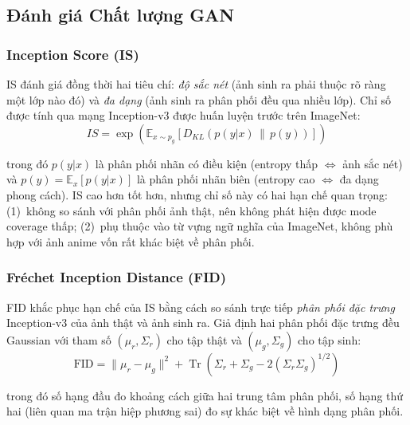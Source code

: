 \subsection{Đánh giá Chất lượng GAN}
\label{subsec:gan_metrics}

\subsubsection{Inception Score (IS)}
\label{subsubsec:is}

IS \cite{Salimans2016} đánh giá đồng thời hai tiêu chí: \textit{độ sắc nét} (ảnh sinh ra phải thuộc rõ ràng một lớp nào đó) và \textit{đa dạng} (ảnh sinh ra phân phối đều qua nhiều lớp). Chỉ số được tính qua mạng Inception-v3 \cite{Szegedy2016} được huấn luyện trước trên ImageNet:
\begin{equation}
\label{eq:inception_score}
IS = \exp\!\left(\mathbb{E}_{x \sim p_g}\left[D_{KL}\!\left(p(y|x) \,\|\, p(y)\right)\right]\right)
\end{equation}

\noindent trong đó $p(y|x)$ là phân phối nhãn có điều kiện (entropy thấp $\Leftrightarrow$ ảnh sắc nét) và $p(y) = \mathbb{E}_{x}[p(y|x)]$ là phân phối nhãn biên (entropy cao $\Leftrightarrow$ đa dạng phong cách). IS cao hơn tốt hơn, nhưng chỉ số này có hai hạn chế quan trọng: (1)~không so sánh với phân phối ảnh thật, nên không phát hiện được mode coverage thấp; (2)~phụ thuộc vào từ vựng ngữ nghĩa của ImageNet, không phù hợp với ảnh anime vốn rất khác biệt về phân phối.

\subsubsection{Fréchet Inception Distance (FID)}
\label{subsubsec:fid}

FID \cite{Heusel2017} khắc phục hạn chế của IS bằng cách so sánh trực tiếp \textit{phân phối đặc trưng} Inception-v3 của ảnh thật và ảnh sinh ra. Giả định hai phân phối đặc trưng đều Gaussian với tham số $(\mu_r, \Sigma_r)$ cho tập thật và $(\mu_g, \Sigma_g)$ cho tập sinh:
\begin{equation}
\label{eq:fid}
\text{FID} = \|\mu_r - \mu_g\|^2 + \operatorname{Tr}\!\left(\Sigma_r + \Sigma_g - 2\left(\Sigma_r \Sigma_g\right)^{1/2}\right)
\end{equation}

\noindent trong đó số hạng đầu đo khoảng cách giữa hai trung tâm phân phối, số hạng thứ hai (liên quan ma trận hiệp phương sai) đo sự khác biệt về hình dạng phân phối.

